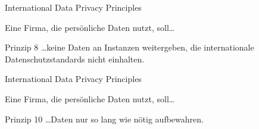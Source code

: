 \begin{frame}{International Data Privacy Principles}

    Eine Firma, die persönliche Daten nutzt, soll\dots

    \begin{block}{Prinzip 8 \cite{zankl_international_2014}}
        \dots keine Daten an Instanzen weitergeben, die internationale Datenschutzstandards nicht einhalten. 
    \end{block}


\end{frame}

\begin{frame}{International Data Privacy Principles}

    Eine Firma, die persönliche Daten nutzt, soll\dots

    \begin{block}{Prinzip 10 \cite{zankl_international_2014}}
        \dots Daten nur so lang wie nötig aufbewahren.
    \end{block}


\end{frame}
